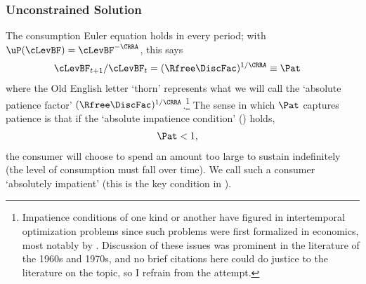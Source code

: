 \documentclass[./BufferStockTheory.tex]{subfiles}
\begin{document}
\hypertarget{Unconstrained-Solution}{}
\subsubsection{Unconstrained Solution} \label{subsec:PFUncon}

\hypertarget{AIC}{}
The consumption Euler equation holds in every period; with $\uP(\cLevBF)=\cLevBF^{-\CRRA}$, this says\hypertarget{Pat}{}
\begin{align}
 \cLevBF_{t+1}/\cLevBF_{t}  & = (\Rfree\DiscFac)^{1/\CRRA} \equiv \Pat   \label{eq:Pat}
\end{align}
where the Old English letter `thorn' represents what we will call the
`absolute patience factor' $(\Rfree
\DiscFac)^{1/\CRRA}$.\footnote{Impatience conditions of one kind or
  another have figured in intertemporal optimization problems since
  such problems were first formalized in economics, most notably by \cite{ramseySave}.
  Discussion of these issues was prominent in the literature of the
  1960s and 1970s, and no brief citations here could do justice to the literature on the topic, so I refrain from the attempt.}  The sense in which $\Pat$ captures
patience is that if the `absolute impatience condition' (\AIC) holds,
\begin{align}
  \label{eq:AIC}
  \Pat  & < 1,
\end{align}
the consumer will choose to spend an amount too large to sustain indefinitely (the
level of consumption must fall over time).  We call such a consumer `absolutely impatient' (this is the key condition in \cite{bewleyPIH}).
\end{document}
